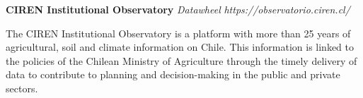 \item
\headerrow
{\textbf{CIREN Institutional Observatory}}
{\emph{}}
\headerrow
{\emph{Datawheel}}
{\emph{https://observatorio.ciren.cl/}}
\begin{itemize*}
    \item The CIREN Institutional Observatory is a platform with more than 25 years 
    of agricultural, soil and climate information on Chile. This information is linked 
    to the policies of the Chilean Ministry of Agriculture through the timely delivery of 
    data to contribute to planning and decision-making in the public and private sectors.
\end{itemize*}